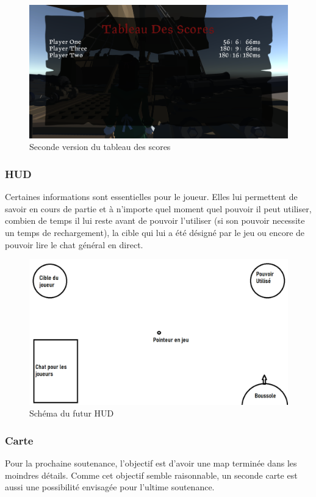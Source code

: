    \begin{figure}[hbt!]
            \centering
            \includegraphics[scale=0.3]{img/newscoreboard.PNG}
            \caption{Seconde version du tableau des scores}
    \end{figure}

\newpage
    \subsubsection{HUD}
    Certaines informations sont essentielles pour le joueur. Elles lui permettent de savoir en cours de partie et à n'importe quel moment quel pouvoir il peut utiliser, combien de temps il lui reste avant de pouvoir l'utiliser (si son pouvoir necessite un temps de rechargement), la cible qui lui a été désigné par le jeu ou encore de pouvoir lire le chat général en direct.
    
    \begin{figure}[hbt!]
            \centering
            \includegraphics[scale=0.3]{img/schem_hud.png}
            \caption{Schéma du futur HUD}
    \end{figure}
    

	\subsubsection{Carte}

	Pour la prochaine soutenance, l'objectif est d'avoir une map terminée dans les moindres 
	détails. Comme cet objectif semble raisonnable, un seconde carte est aussi une possibilité 
	envisagée pour l'ultime soutenance.